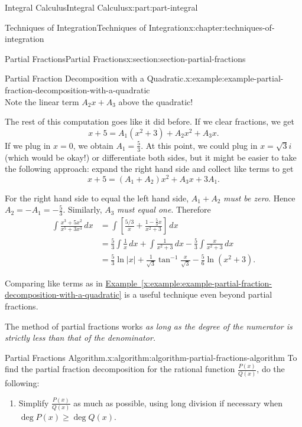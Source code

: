 \documentclass[twoside,10pt,]{book}
\newcommand{\xreffont}{\relax}
\numberwithin{equation}{part}
\begin{document}
\begin{partptx}{Integral Calculus}{}{Integral Calculus}{}{}{x:part:part-integral}
\begin{chapterptx}{Techniques of Integration}{}{Techniques of Integration}{}{}{x:chapter:techniques-of-integration}
\begin{sectionptx}{Partial Fractions}{}{Partial Fractions}{}{}{x:section:section-partial-fractions}
\begin{example}{Partial Fraction Decomposition with a Quadratic.}{x:example:example-partial-fraction-decomposition-with-a-quadratic}
\begin{equation*}
\end{equation*}
Note the linear term \(A_{2}x + A_{3}\) above the quadratic!%
\par
The rest of this computation goes like it did before. If we clear fractions, we get%
\begin{equation*}
x + 5 = A_{1}(x^{2} + 3) + A_{2}x^{2} + A_{3}x.
\end{equation*}
If we plug in \(x = 0\), we obtain \(A_{1} = \frac{5}{3}\). At this point, we could plug in \(x = \sqrt{3}i\) (which would be okay!) or differentiate both sides, but it might be easier to take the following approach: expand the right hand side and collect like terms to get%
\begin{equation*}
x + 5 = (A_{1} + A_{2})x^{2} + A_{3}x + 3A_{1}.
\end{equation*}
%
\par
For the right hand side to equal the left hand side, \(A_{1} + A_{2}\) \emph{must be zero}. Hence \(A_{2} = -A_{1} = -\frac{5}{3}\). Similarly, \(A_{3}\) \emph{must equal one}. Therefore%
\begin{align*}
\int\frac{x^{3} + 5x^{2}}{x^{5} + 3x^{3}}\,dx & = \int\left[\frac{5/3}{x} + \frac{1 - \frac{5}{3}x}{x^{2} + 3}\right]\,dx \\
& = \frac{5}{3}\int\frac{1}{x}\,dx + \int\frac{1}{x^{2} + 3}\,dx - \frac{5}{3}\int\frac{x}{x^{2} + 3}\,dx \\
& = \frac{5}{3}\ln|x| + \frac{1}{\sqrt{3}}\tan^{-1}\frac{x}{\sqrt{3}} - \frac{5}{6}\ln(x^{2} + 3). 
\end{align*}
%
\end{example}
Comparing like terms as in \hyperref[x:example:example-partial-fraction-decomposition-with-a-quadratic]{Example~{\xreffont\ref{x:example:example-partial-fraction-decomposition-with-a-quadratic}}} is a useful technique even beyond partial fractions.%
\par
The method of partial fractions works \emph{as long as the degree of the numerator is strictly less than that of the denominator.}%
\begin{algorithm}{Partial Fractions Algorithm.}{}{x:algorithm:algorithm-partial-fractions-algorithm}%
%
To find the partial fraction decomposition for the rational function \(\frac{P(x)}{Q(x)}\), do the following:%
\begin{enumerate}
\item{}Simplify \(\frac{P(x)}{Q(x)}\) as much as possible, using long division if necessary when \(\deg P(x) \geq \deg Q(x)\).%

\end{enumerate}
\end{algorithm}
\end{sectionptx}
\end{chapterptx}
\end{partptx}
\end{document}
